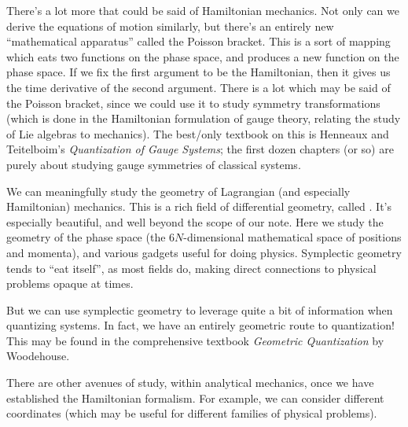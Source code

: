 There's a lot more that could be said of Hamiltonian mechanics. Not only
can we derive the equations of motion similarly, but there's an entirely
new ``mathematical apparatus'' called the Poisson bracket. This is a
sort of mapping which eats two functions on the phase space, and
produces a new function on the phase space. If we fix the first argument
to be the Hamiltonian, then it gives us the time derivative of the
second argument. There is a lot which may be said of the Poisson
bracket, since we could use it to study symmetry transformations (which
is done in the Hamiltonian formulation of gauge theory, relating the
study of Lie algebras to mechanics). The best/only textbook on this is
Henneaux and Teitelboim's \emph{Quantization of Gauge Systems}; the
first dozen chapters (or so) are purely about studying gauge symmetries
of classical systems.

We can meaningfully study the geometry of Lagrangian (and especially
Hamiltonian) mechanics. This is a rich field of differential geometry,
called . It's especially beautiful, and well
beyond the scope of our note. Here we study the geometry of the phase
space (the $6N$-dimensional mathematical space of positions and
momenta), and various gadgets useful for doing physics. Symplectic
geometry tends to ``eat itself'', as most fields do, making direct
connections to physical problems opaque at times.

But we can use symplectic geometry to leverage quite a bit of
information when quantizing systems. In fact, we have an entirely
geometric route to quantization! This may be found in the
comprehensive textbook \emph{Geometric Quantization} by Woodehouse.

There are other avenues of study, within analytical mechanics, once we
have established the Hamiltonian formalism. For example, we can consider
different coordinates (which may be useful for different families of
physical problems).

